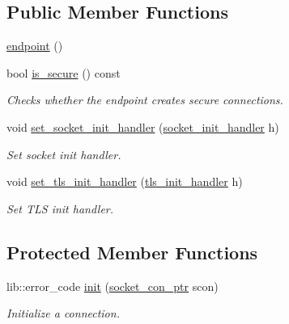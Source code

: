 \subsection*{Public Member Functions}
\begin{DoxyCompactItemize}
\item 
\hyperlink{classwebsocketpp_1_1transport_1_1asio_1_1tls__socket_1_1endpoint_a0eb278a405e57a22fa2d226003e2b158}{endpoint} ()
\item 
bool \hyperlink{classwebsocketpp_1_1transport_1_1asio_1_1tls__socket_1_1endpoint_a6c260355c0a4f69549f176b4d129860b}{is\+\_\+secure} () const 
\begin{DoxyCompactList}\small\item\em Checks whether the endpoint creates secure connections. \end{DoxyCompactList}\item 
void \hyperlink{classwebsocketpp_1_1transport_1_1asio_1_1tls__socket_1_1endpoint_ae9466b3c3169eb1757ca64a1462ac86e}{set\+\_\+socket\+\_\+init\+\_\+handler} (\hyperlink{namespacewebsocketpp_1_1transport_1_1asio_1_1tls__socket_a0ec24de8bf054a4bc6f6c018e743efea}{socket\+\_\+init\+\_\+handler} h)
\begin{DoxyCompactList}\small\item\em Set socket init handler. \end{DoxyCompactList}\item 
void \hyperlink{classwebsocketpp_1_1transport_1_1asio_1_1tls__socket_1_1endpoint_aaa8973ceabe2423f535f6cfd2f7cbd53}{set\+\_\+tls\+\_\+init\+\_\+handler} (\hyperlink{namespacewebsocketpp_1_1transport_1_1asio_1_1tls__socket_a6fe279813cc19b05a3897d20f10f16d2}{tls\+\_\+init\+\_\+handler} h)
\begin{DoxyCompactList}\small\item\em Set T\+L\+S init handler. \end{DoxyCompactList}\end{DoxyCompactItemize}
\subsection*{Protected Member Functions}
\begin{DoxyCompactItemize}
\item 
lib\+::error\+\_\+code \hyperlink{classwebsocketpp_1_1transport_1_1asio_1_1tls__socket_1_1endpoint_a3fcd99c817947b9e23f0438c976edc64}{init} (\hyperlink{classwebsocketpp_1_1transport_1_1asio_1_1tls__socket_1_1endpoint_ad0babd14e53524633840467d072710c3}{socket\+\_\+con\+\_\+ptr} scon)
\begin{DoxyCompactList}\small\item\em Initialize a connection. \end{DoxyCompactList}\end{DoxyCompactItemize}


